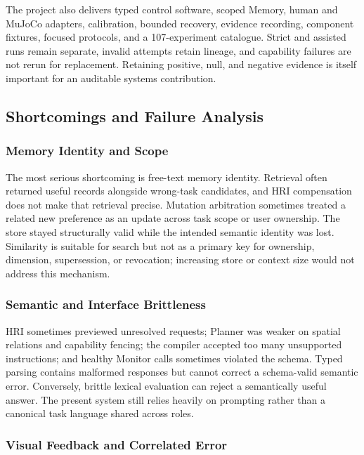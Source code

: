 \documentclass{article}
\begin{document}
The project also delivers typed control software, scoped Memory, human and
MuJoCo adapters, calibration, bounded recovery, evidence recording, component
fixtures, focused protocols, and a 107-experiment catalogue. Strict and assisted
runs remain separate, invalid attempts retain lineage, and capability failures
are not rerun for replacement. Retaining positive, null, and negative evidence
is itself important for an auditable systems contribution.

\subsection{Shortcomings and Failure Analysis}
\label{subsec:discussion-shortcomings}

\subsubsection{Memory Identity and Scope}

The most serious shortcoming is free-text memory identity. Retrieval often
returned useful records alongside wrong-task candidates, and HRI compensation
does not make that retrieval precise. Mutation arbitration sometimes treated a
related new preference as an update across task scope or user ownership. The
store stayed structurally valid while the intended semantic identity was lost.
Similarity is suitable for search but not as a primary key for ownership,
dimension, supersession, or revocation; increasing store or context size would
not address this mechanism.

\subsubsection{Semantic and Interface Brittleness}

HRI sometimes previewed unresolved requests; Planner was weaker on spatial
relations and capability fencing; the compiler accepted too many unsupported
instructions; and healthy Monitor calls sometimes violated the schema. Typed
parsing contains malformed responses but cannot correct a schema-valid semantic
error. Conversely, brittle lexical evaluation can reject a semantically useful
answer. The present system still relies heavily on prompting rather than a
canonical task language shared across roles.

\subsubsection{Visual Feedback and Correlated Error}
\end{document}
